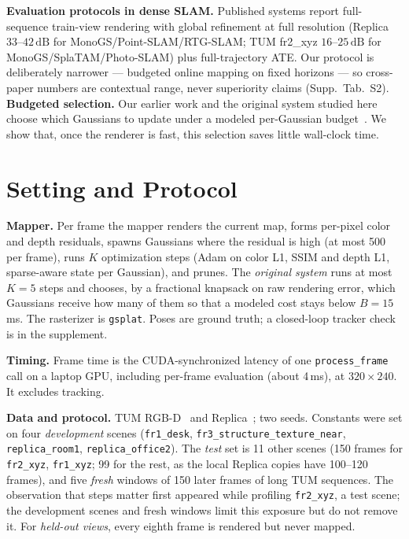 \documentclass[10pt,twocolumn,letterpaper]{article}
\begin{document}
\textbf{Evaluation protocols in dense SLAM.}
Published systems report full-sequence train-view rendering with global refinement at full resolution (Replica $33$--$42\,\mathrm{dB}$ for MonoGS/Point-SLAM/RTG-SLAM; TUM fr2\_xyz $16$--$25\,\mathrm{dB}$ for MonoGS/SplaTAM/Photo-SLAM) plus full-trajectory ATE. Our protocol is deliberately narrower --- budgeted online mapping on fixed horizons --- so cross-paper numbers are contextual range, never superiority claims (Supp.\ Tab.~S2).
\textbf{Budgeted selection.}
Our earlier work and the original system studied here choose which Gaussians to update under a modeled per-Gaussian budget~\cite{nemhauser1978analysis,sviridenko2004knapsack}. We show that, once the renderer is fast, this selection saves little wall-clock time.

\section{Setting and Protocol}
\label{sec:setting}
\textbf{Mapper.} Per frame the mapper renders the current map, forms per-pixel color and depth residuals, spawns Gaussians where the residual is high (at most 500 per frame), runs $K$ optimization steps (Adam on color L1, SSIM and depth L1, sparse-aware state per Gaussian), and prunes. The \emph{original system} runs at most $K{=}5$ steps and chooses, by a fractional knapsack on raw rendering error, which Gaussians receive how many of them so that a modeled cost stays below $B{=}15$\,ms. The rasterizer is \texttt{gsplat}. Poses are ground truth; a closed-loop tracker check is in the supplement.

\textbf{Timing.} Frame time is the CUDA-synchronized latency of one \texttt{process\_frame} call on a laptop GPU, including per-frame evaluation (about 4\,ms), at $320{\times}240$. It excludes tracking.

\textbf{Data and protocol.} TUM RGB-D~\cite{sturm2012benchmark} and Replica~\cite{straub2019replica}; two seeds. Constants were set on four \emph{development} scenes (\texttt{fr1\_desk}, \texttt{fr3\_structure\_texture\_near}, \texttt{replica\_room1}, \texttt{replica\_office2}). The \emph{test} set is 11 other scenes (150 frames for \texttt{fr2\_xyz}, \texttt{fr1\_xyz}; 99 for the rest, as the local Replica copies have 100--120 frames), and five \emph{fresh} windows of 150 later frames of long TUM sequences. The observation that steps matter first appeared while profiling \texttt{fr2\_xyz}, a test scene; the development scenes and fresh windows limit this exposure but do not remove it. For \emph{held-out views}, every eighth frame is rendered but never mapped.
\end{document}
